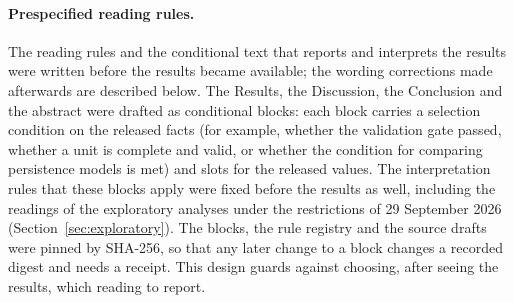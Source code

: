 
\paragraph{Prespecified reading rules.}
The reading rules and the conditional text that reports and interprets the results were written before the results became available; the wording corrections made afterwards are described below. The Results, the Discussion, the Conclusion and the abstract were drafted as conditional blocks: each block carries a selection condition on the released facts (for example, whether the validation gate passed, whether a unit is complete and valid, or whether the condition for comparing persistence models is met) and slots for the released values. The interpretation rules that these blocks apply were fixed before the results as well, including the readings of the exploratory analyses under the restrictions of 29 September 2026 (Section~\ref{sec:exploratory}). The blocks, the rule registry and the source drafts were pinned by SHA-256, so that any later change to a block changes a recorded digest and needs a receipt. This design guards against choosing, after seeing the results, which reading to report.

